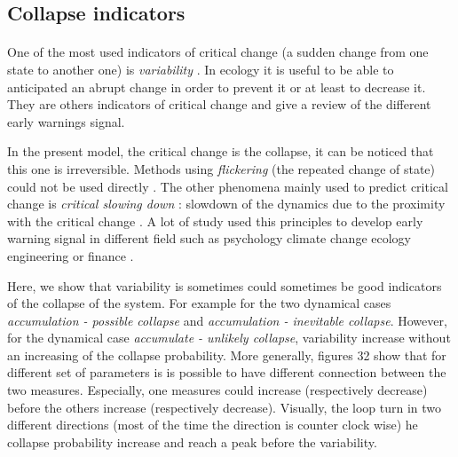 \documentclass{article}
\begin{document}



\subsection{Collapse indicators}

\paragraph{}
One of the most used indicators of critical change (a sudden change from one state to another one) is \textit{variability} \citep{brock_variance_2006, carpenter2006rising, scheffer2015generic, dakos_robustness_2012, biggs_turning_2009}. In ecology it is useful to be able to anticipated an abrupt change in order to prevent it or at least to decrease it. They are others indicators of critical change \cite{scheffer_generic_2015} and \cite{dakos_methods_2012} give a review of the different early warnings signal. 

In the present model, the critical change is the collapse, it can be noticed that this one is irreversible. Methods using \textit{flickering} (the repeated change of state) could not be used directly \citep{carr_modeling_2012, wang_flickering_2012, dakos_flickering_2013}. The other phenomena mainly used to predict critical change is \textit{critical slowing down} : slowdown of the dynamics due to the proximity with the critical change \citep{dakos_critical_2014, dakos_slowing_nodate, scheffer_anticipating_2012}. A lot of study used this principles to develop early warning signal in different field such as psychology \citep{van_de_leemput_critical_2014} climate change \citep{lenton_early_2012} ecology \citep{chisholm_critical_2009, gandhi_critical_1998} engineering \citep{ren_early_2015} or finance \citep{diks_critical_2018}.

Here, we show that variability is sometimes could sometimes be good indicators of the collapse of the system. For example for the two dynamical cases \textit{accumulation - possible collapse} and \textit{accumulation - inevitable collapse}. However, for the dynamical case \textit{accumulate - unlikely collapse}, variability increase without an increasing of the collapse probability. More generally, figures 32 \todo{} show that for different set of parameters is is possible to have different connection between the two measures. Especially, one measures could increase (respectively decrease) before the others increase (respectively decrease). Visually, the loop turn in two different directions (most of the time the direction is counter clock wise) he collapse probability increase and reach a peak before the variability.
\end{document}
